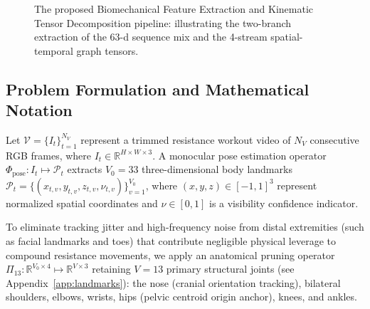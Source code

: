 \documentclass[runningheads]{llncs}
\begin{document}
\begin{figure}[!t]
{
}
\caption{The proposed Biomechanical Feature Extraction and Kinematic Tensor Decomposition pipeline: illustrating the two-branch extraction of the 63-d sequence mix and the 4-stream spatial-temporal graph tensors.}
\label{fig:feat_extraction_pipeline}
\end{figure}

\subsection{Problem Formulation and Mathematical Notation}
Let $\mathcal{V} = \{I_t\}_{t=1}^{N_V}$ represent a trimmed resistance workout video of $N_V$ consecutive RGB frames, where $I_t \in \mathbb{R}^{H \times W \times 3}$. A monocular pose estimation operator $\Phi_{\text{pose}}: I_t \mapsto \mathcal{P}_t$ extracts $V_0 = 33$ three-dimensional body landmarks $\mathcal{P}_t = \{(x_{t, v}, y_{t, v}, z_{t, v}, \nu_{t, v})\}_{v=1}^{V_0}$, where $(x, y, z) \in [-1, 1]^3$ represent normalized spatial coordinates and $\nu \in [0, 1]$ is a visibility confidence indicator. 

To eliminate tracking jitter and high-frequency noise from distal extremities (such as facial landmarks and toes) that contribute negligible physical leverage to compound resistance movements, we apply an anatomical pruning operator $\Pi_{13}: \mathbb{R}^{V_0 \times 4} \mapsto \mathbb{R}^{V \times 3}$ retaining $V = 13$ primary structural joints (see Appendix~\ref{app:landmarks}): the nose (cranial orientation tracking), bilateral shoulders, elbows, wrists, hips (pelvic centroid origin anchor), knees, and ankles.
\end{document}
